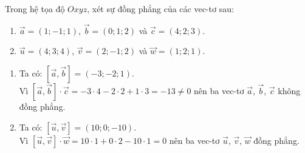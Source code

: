 \begin{vd}%
	Trong hệ tọa độ $Oxyz$, xét sự đồng phẳng của các vec-tơ sau:
	\begin{enumerate}
		\item $\overrightarrow{a} = (1;-1;1)$, $\overrightarrow{b} = (0;1;2)$ và $\overrightarrow{c} = (4;2;3)$.
		\item $\overrightarrow{u} = (4;3;4)$, $\overrightarrow{v} = (2;-1;2)$ và $\overrightarrow{w} = (1;2;1)$.
	\end{enumerate}
	\loigiai
	{
		\begin{enumerate}
			\item Ta có: $\left[ \overrightarrow{a}, \overrightarrow{b} \right] = (-3;-2;1)$.\\
			Vì $\left[ \overrightarrow{a}, \overrightarrow{b} \right] \cdot \overrightarrow{c} = -3 \cdot 4 -2 \cdot 2 + 1 \cdot 3 = -13 \neq 0$ nên ba vec-tơ $\overrightarrow{a}$, $\overrightarrow{b}$, $\overrightarrow{c}$ không đồng phẳng.
			
			\item Ta có: $\left[ \overrightarrow{u}, \overrightarrow{v} \right] = (10;0;-10)$.\\
			Vì $\left[ \overrightarrow{u}, \overrightarrow{v} \right] \cdot \overrightarrow{w} = 10 \cdot 1 + 0 \cdot 2 - 10 \cdot 1 = 0$ nên ba vec-tơ $\overrightarrow{u}$, $\overrightarrow{v}$, $\overrightarrow{w}$  đồng phẳng.
		\end{enumerate}
	}
\end{vd}


